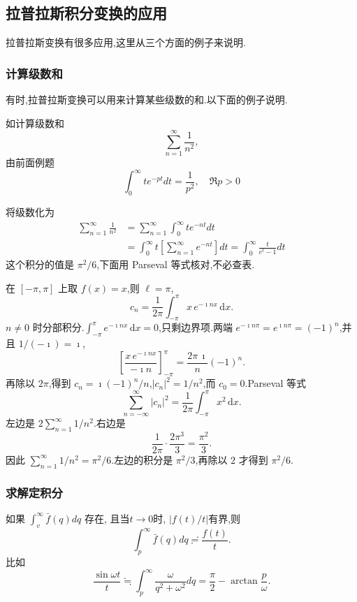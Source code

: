 \subsection{拉普拉斯积分变换的应用}
\label{subsec:applications}
拉普拉斯变换有很多应用,这里从三个方面的例子来说明.
\subsubsection{计算级数和}
有时,拉普拉斯变换可以用来计算某些级数的和.以下面的例子说明.

如计算级数和
$$
    \sum_{n=1} ^{\infty}  \frac{1}{n^2},
$$
由前面例题
$$
\int_0^{\infty} t e^{-p t} d t=\frac{1}{p^2}, \quad \Re p>0
$$

将级数化为
$$
\begin{aligned}
\sum_{n= 1}^{\infty} \frac{1}{n^2} & =\sum_{n=1}^{\infty} \int_0^{\infty} t e^{-n t} d t \\
& =\int_0^{\infty} t\left[\sum_{n=1}^{\infty} e^{-n t}\right] d t=\int_0^{\infty} \frac{t}{e^t-1} d t
\end{aligned}
$$
这个积分的值是 $\pi^2/6$,下面用 Parseval 等式核对,不必查表.

在 $[-\pi,\pi]$ 上取 $f(x)=x$,则 $\ell=\pi$,
\begin{equation}
  c_n = \frac{1}{2\pi}\int_{-\pi}^{\pi} x\, e^{-\imath n x}\,\mathrm{d}x.
\end{equation}
$n\neq 0$ 时分部积分.$\int_{-\pi}^{\pi} e^{-\imath n x}\,\mathrm{d}x=0$,只剩边界项.两端 $e^{-\imath n\pi}=e^{\imath n\pi}=(-1)^n$,并且 $1/(-\imath)=\imath$,
\begin{equation}
  \left[\frac{x\,e^{-\imath n x}}{-\imath n}\right]_{-\pi}^{\pi}
  = \frac{2\pi\,\imath}{n}(-1)^n.
\end{equation}
再除以 $2\pi$,得到 $c_n = \imath (-1)^n/n$,$|c_n|^2=1/n^2$,而 $c_0=0$.Parseval 等式
\begin{equation}
  \sum_{n=-\infty}^{\infty}|c_n|^2
  = \frac{1}{2\pi}\int_{-\pi}^{\pi} x^2\,\mathrm{d}x.
\end{equation}
左边是 $2\sum_{n=1}^{\infty} 1/n^2$.右边是
\begin{equation}
  \frac{1}{2\pi}\cdot\frac{2\pi^3}{3} = \frac{\pi^2}{3}.
\end{equation}
因此 $\sum_{n=1}^{\infty} 1/n^2=\pi^2/6$.左边的积分是 $\pi^2/3$,再除以 $2$ 才得到 $\pi^2/6$.

\subsubsection{求解定积分}
如果 $\int_v^{\infty} \bar{f}(q) d q$ 存在, 且当$t\to 0$时, $|f(t)/t|$有界,则
\begin{equation}
    \int_{p}^{\infty} \bar{f}(q) dq \risingdotseq \frac{f(t)}{t} . 
\end{equation}
比如
$$
\frac{\sin \omega t}{t} \fallingdotseq \int_p^{\infty} \frac{\omega}{q^2+\omega^2} d q=\frac{\pi}{2}-\arctan \frac{p}{\omega}.
$$

